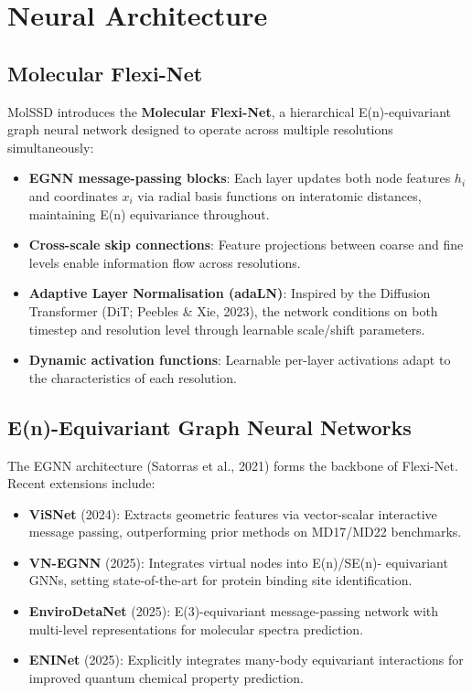 \documentclass[11pt,a4paper]{article}
\begin{document}
\section{Neural Architecture}

\subsection{Molecular Flexi-Net}

MolSSD introduces the \textbf{Molecular Flexi-Net}, a hierarchical
E(n)-equivariant graph neural network designed to operate across multiple
resolutions simultaneously:

\begin{itemize}[leftmargin=2em]
  \item \textbf{EGNN message-passing blocks}: Each layer updates both node
    features $h_i$ and coordinates $x_i$ via radial basis functions on
    interatomic distances, maintaining E(n) equivariance throughout.
  \item \textbf{Cross-scale skip connections}: Feature projections between
    coarse and fine levels enable information flow across resolutions.
  \item \textbf{Adaptive Layer Normalisation (adaLN)}: Inspired by the
    Diffusion Transformer (DiT; Peebles \& Xie, 2023), the network
    conditions on both timestep and resolution level through learnable
    scale/shift parameters.
  \item \textbf{Dynamic activation functions}: Learnable per-layer
    activations adapt to the characteristics of each resolution.
\end{itemize}

\subsection{E(n)-Equivariant Graph Neural Networks}

The EGNN architecture (Satorras et al., 2021) forms the backbone of
Flexi-Net. Recent extensions include:

\begin{itemize}[leftmargin=2em]
  \item \textbf{ViSNet} (2024): Extracts geometric features via
    vector-scalar interactive message passing, outperforming prior methods
    on MD17/MD22 benchmarks.
  \item \textbf{VN-EGNN} (2025): Integrates virtual nodes into E(n)/SE(n)-
    equivariant GNNs, setting state-of-the-art for protein binding site
    identification.
  \item \textbf{EnviroDetaNet} (2025): E(3)-equivariant message-passing
    network with multi-level representations for molecular spectra
    prediction.
  \item \textbf{ENINet} (2025): Explicitly integrates many-body equivariant
    interactions for improved quantum chemical property prediction.
\end{itemize}
\end{document}
